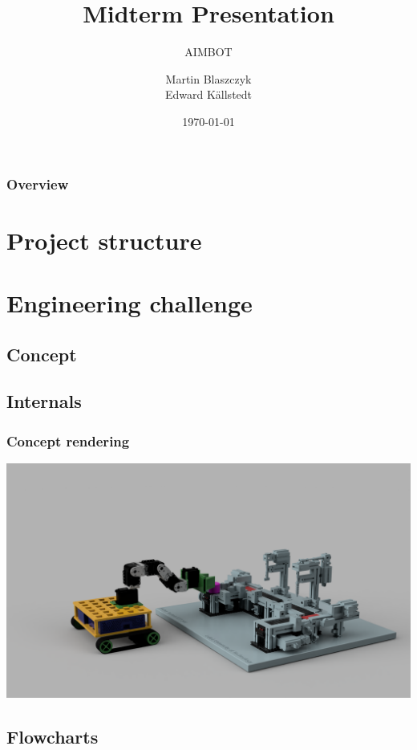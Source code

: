 \documentclass{beamer}
\title{Midterm Presentation}
\subtitle{AIMBOT}
\author{Martin Blaszczyk \\ Edward Källstedt}
\institute{Luleå University of Technology}
\date{\today}
\begin{document}
\begin{frame}
    \titlepage
\end{frame}

\begin{frame}
    \frametitle{Overview}
    \tableofcontents
\end{frame}


\section{Project structure}



\section{Engineering challenge}
\subsection{Concept}


\subsection{Internals}

\begin{frame}
    \frametitle{Concept rendering}
    \includegraphics[width=\textwidth]{frames/img/b4_manufacturing.PNG}
\end{frame}
\subsection{Flowcharts}



\end{document}
